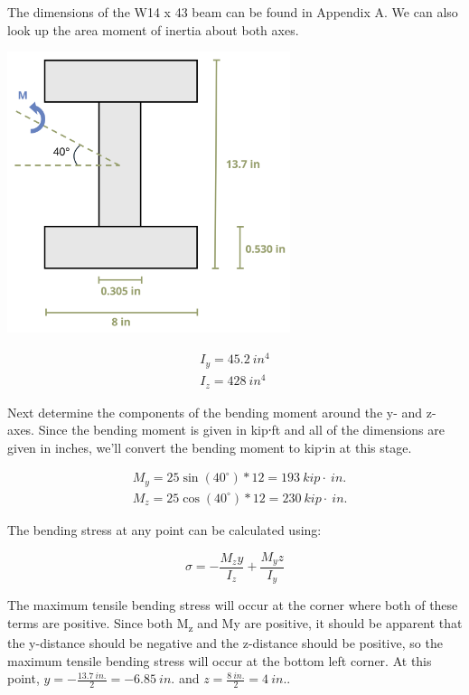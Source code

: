 \documentclass[
  letterpaper,
  DIV=11,
  numbers=noendperiod]{scrreprt}
\theoremstyle{definition}
\theoremstyle{remark}
\begin{document}
\begin{tcolorbox}
\begin{tcolorbox}
The dimensions of the W14 x 43 beam can be found in Appendix A. We can
also look up the area moment of inertia about both axes.

\begin{center}
\includegraphics[width=3.26042in,height=\textheight]{images/CH9 PNGs/Example 9.6 part 2.png}
\end{center}

\[
\begin{gathered}
I_y=45.2{~in}^4 \\
I_z=428{~in}^4
\end{gathered}
\]

Next determine the components of the bending moment around the y- and
z-axes. Since the bending moment is given in kip⸱ft and all of the
dimensions are given in inches, we'll convert the bending moment to
kip⸱in at this stage.

\[
\begin{aligned}
& M_y=25 \sin \left(40^{\circ}\right) * 12=193{~kip}\cdot{~in.} \\
& M_z=25 \cos \left(40^{\circ}\right) * 12=230{~kip}\cdot{~in.}
\end{aligned}
\]

The bending stress at any point can be calculated using:

\[
\sigma=-\frac{M_z y}{I_z}+\frac{M_y z}{I_y}
\]

The maximum tensile bending stress will occur at the corner where both
of these terms are positive. Since both M\textsubscript{z} and My are
positive, it should be apparent that the y-distance should be negative
and the z-distance should be positive, so the maximum tensile bending
stress will occur at the bottom left corner. At this point,
\(y=-\frac{13.7{~in.}}{2}=-6.85{~in.}\) and
\(z=\frac{8{~in.}}{2}=4{~in.}\).


\end{tcolorbox}
\end{tcolorbox}
\end{document}
